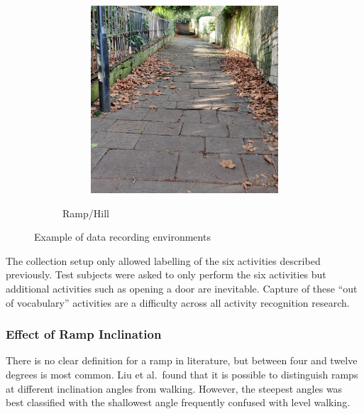 \begin{figure}[p]
\begin{subfigure}[b]{\textwidth}
\begin{subfigure}[b]{0.32\textwidth}
        \end{subfigure}
        \hfill
        \begin{subfigure}[b]{0.32\textwidth}
            \centering
            \includegraphics[width=\textwidth]{content/3-Methods/enviroments/ramp_3_modified.jpg}
        \end{subfigure}
        \caption{Ramp/Hill}
        \label{fig:methods-ramp-example}
    \end{subfigure}
    \caption{Example of data recording environments}
    \label{fig:methods-example-enviroments}
\end{figure}


The collection setup only allowed labelling of the six activities described previously. Test subjects were asked to only perform the six activities but additional activities such as opening a door are inevitable. Capture of these ``out of vocabulary'' activities are a difficulty across all activity recognition research\cite{Cook2013a}.

\subsubsection{Effect of Ramp Inclination}
There is no clear definition for a ramp in literature, but between four and twelve degrees is most common\cite{Godiyal2018a, Lu2020, Liu2021, Su2021}. Liu et al.~found that it is possible to distinguish ramps at different inclination angles from walking. However, the steepest angles was best classified with the shallowest angle frequently confused with level walking.\cite{Liu2021}


